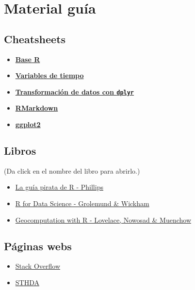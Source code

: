 \documentclass[]{article}
\providecommand{\tightlist}{%
  \setlength{\itemsep}{0pt}\setlength{\parskip}{0pt}}
\begin{document}
\section{Material guía}\label{material-guia}

\subsection{Cheatsheets}\label{cheatsheets}

\begin{itemize}
\item
  \href{https://www.rstudio.com/wp-content/uploads/2016/10/r-cheat-sheet-3.pdf}{\textbf{Base
  R}}
\item
  \href{https://github.com/rstudio/cheatsheets/raw/master/lubridate.pdf}{\textbf{Variables
  de tiempo}}
\item
  \href{https://github.com/rstudio/cheatsheets/raw/master/data-transformation.pdf}{\textbf{Transformación
  de datos con \texttt{dplyr}}}
\item
  \href{https://www.rstudio.com/wp-content/uploads/2015/03/rmarkdown-reference.pdf}{\textbf{RMarkdown}}
\item
  \href{https://github.com/rstudio/cheatsheets/raw/master/data-visualization-2.1.pdf}{\textbf{ggplot2}}
\end{itemize}

\subsection{Libros}\label{libros}

(Da click en el nombre del libro para abrirlo.)

\begin{itemize}
\tightlist
\item
  \href{https://bookdown.org/ndphillips/YaRrr/}{La guía pirata de R -
  Phillips}
\item
  \href{http://r4ds.had.co.nz/}{R for Data Science - Grolemund \&
  Wickham}
\item
  \href{https://geocompr.robinlovelace.net/}{Geocomputation with R -
  Lovelace, Nowosad \& Muenchow}
\end{itemize}

\subsection{Páginas webs}\label{paginas-webs}

\begin{itemize}
\tightlist
\item
  \href{https://stackoverflow.com/}{Stack Overflow}
\item
  \href{http://www.sthda.com/english/}{STHDA}
\end{itemize}
\end{document}
